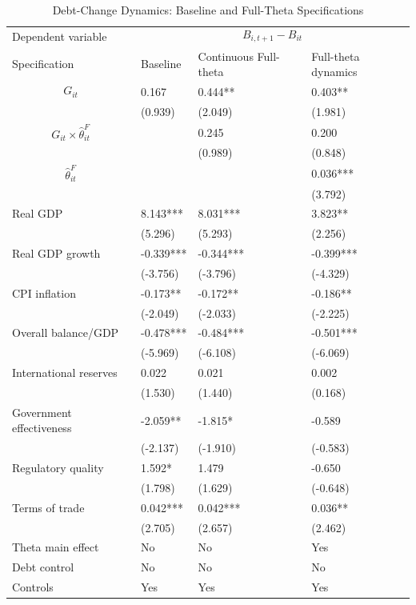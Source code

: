 \begin{table}[H]\centering
\begin{threeparttable}
\caption{Debt-Change Dynamics: Baseline and Full-Theta Specifications}
\label{tab:debt_change_combined_fulltheta}
\scriptsize
\begin{tabularx}{\textwidth}{lYYY}
\toprule
Dependent variable &  \\
\cmidrule(lr){2-4}
Specification & Baseline & Continuous Full-theta & Full-theta dynamics \\
\midrule
$$G_{it}$$ & 0.167 & 0.444** & 0.403** \\
 & (0.939) & (2.049) & (1.981) \\
$$G_{it}\times\widehat{\theta}^{F}_{it}$$ &  & 0.245 & 0.200 \\
 &  & (0.989) & (0.848) \\
$$\widehat{\theta}^{F}_{it}$$ &  &  & 0.036*** \\
 &  &  & (3.792) \\
Real GDP & 8.143*** & 8.031*** & 3.823** \\
 & (5.296) & (5.293) & (2.256) \\
Real GDP growth & -0.339*** & -0.344*** & -0.399*** \\
 & (-3.756) & (-3.796) & (-4.329) \\
CPI inflation & -0.173** & -0.172** & -0.186** \\
 & (-2.049) & (-2.033) & (-2.225) \\
Overall balance/GDP & -0.478*** & -0.484*** & -0.501*** \\
 & (-5.969) & (-6.108) & (-6.069) \\
International reserves & 0.022 & 0.021 & 0.002 \\
 & (1.530) & (1.440) & (0.168) \\
Government effectiveness & -2.059** & -1.815* & -0.589 \\
 & (-2.137) & (-1.910) & (-0.583) \\
Regulatory quality & 1.592* & 1.479 & -0.650 \\
 & (1.798) & (1.629) & (-0.648) \\
Terms of trade & 0.042*** & 0.042*** & 0.036** \\
 & (2.705) & (2.657) & (2.462) \\
\midrule
Theta main effect & No & No & Yes \\
Debt control & No & No & No \\
Controls & Yes & Yes & Yes \\

\end{tabularx}
\end{threeparttable}
\end{table}
